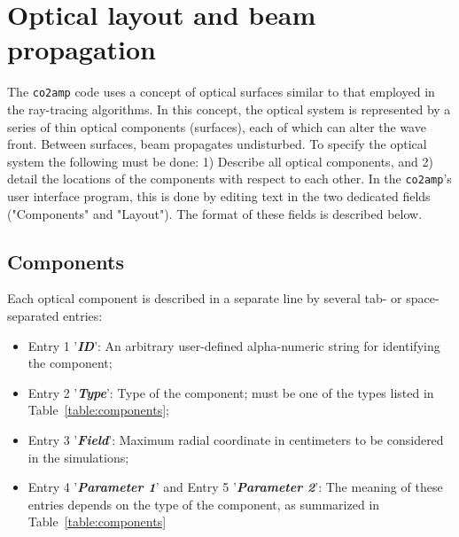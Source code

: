 \documentclass{report}
\begin{document}
\section{Optical layout and beam propagation}
The \texttt{co2amp} code uses a concept of optical surfaces similar to that employed in the ray-tracing algorithms. In this concept, the optical system is represented by a series of thin optical components (surfaces), each of which can alter the wave front. Between surfaces, beam propagates undisturbed. To specify the optical system the following must be done:  1) Describe all optical components, and 2) detail the locations of the components with respect to each other. In the \texttt{co2amp}'s user interface program, this is done by editing text in the two dedicated fields ("Components" and "Layout"). The format of these fields is described below. 

\subsection{Components}
Each optical component is described in a separate line by several tab- or space-separated entries:

\begin{itemize}
\item Entry 1 '\textit{\textbf{ID}}': An arbitrary user-defined alpha-numeric string for identifying the component;
\item Entry 2 '\textit{\textbf{Type}}': Type of the component; must be one of the types listed in Table~\ref{table:components};
\item Entry 3 '\textit{\textbf{Field}}': Maximum radial coordinate in centimeters to be considered in the simulations;
\item Entry 4 '\textit{\textbf{Parameter 1}}' and Entry 5 '\textit{\textbf{Parameter 2}}': The meaning of these entries depends on the type of the component, as summarized in Table~\ref{table:components}
\end{itemize}
\end{document}

